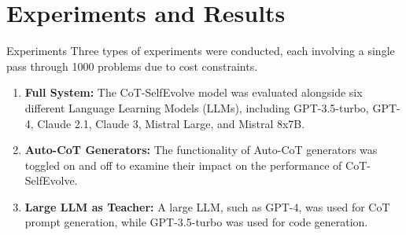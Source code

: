 \section{Experiments and Results}

\begin{frame}{Experiments}
    Three types of experiments were conducted, each involving a single pass through 1000 problems due to cost constraints.

    \begin{enumerate}
        \item \textbf{Full System:} The CoT-SelfEvolve model was evaluated alongside six different Language Learning Models (LLMs), including GPT-3.5-turbo, GPT-4, Claude 2.1, Claude 3, Mistral Large, and Mistral 8x7B.

        \item \textbf{Auto-CoT Generators:} The functionality of Auto-CoT generators was toggled on and off to examine their impact on the performance of CoT-SelfEvolve.

        \item \textbf{Large LLM as Teacher:} A large LLM, such as GPT-4, was used for CoT prompt generation, while GPT-3.5-turbo was used for code generation.
    \end{enumerate}
\end{frame}

